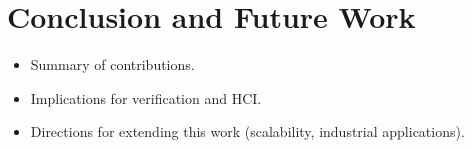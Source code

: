 \documentclass[12pt]{report}
\begin{document}
\chapter{Conclusion and Future Work}
\begin{itemize}
  \item Summary of contributions.
  \item Implications for verification and HCI.
  \item Directions for extending this work (scalability, industrial applications).
\end{itemize}



\end{document}
